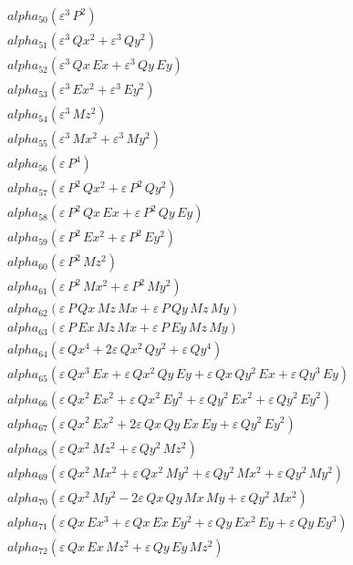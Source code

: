 \documentclass{article}
\begin{document}
\begin{align*}
  &\quad alpha_{50} \left(ε^{3}\,P^{2}\right) \\
  &\quad alpha_{51} \left(ε^{3}\,Qx^{2} + ε^{3}\,Qy^{2}\right) \\
  &\quad alpha_{52} \left(ε^{3}\,Qx\,Ex + ε^{3}\,Qy\,Ey\right) \\
  &\quad alpha_{53} \left(ε^{3}\,Ex^{2} + ε^{3}\,Ey^{2}\right) \\
  &\quad alpha_{54} \left(ε^{3}\,Mz^{2}\right) \\
  &\quad alpha_{55} \left(ε^{3}\,Mx^{2} + ε^{3}\,My^{2}\right) \\
  &\quad alpha_{56} \left(ε\,P^{4}\right) \\
  &\quad alpha_{57} \left(ε\,P^{2}\,Qx^{2} + ε\,P^{2}\,Qy^{2}\right) \\
  &\quad alpha_{58} \left(ε\,P^{2}\,Qx\,Ex + ε\,P^{2}\,Qy\,Ey\right) \\
  &\quad alpha_{59} \left(ε\,P^{2}\,Ex^{2} + ε\,P^{2}\,Ey^{2}\right) \\
  &\quad alpha_{60} \left(ε\,P^{2}\,Mz^{2}\right) \\
  &\quad alpha_{61} \left(ε\,P^{2}\,Mx^{2} + ε\,P^{2}\,My^{2}\right) \\
  &\quad alpha_{62} \left(ε\,P\,Qx\,Mz\,Mx + ε\,P\,Qy\,Mz\,My\right) \\
  &\quad alpha_{63} \left(ε\,P\,Ex\,Mz\,Mx + ε\,P\,Ey\,Mz\,My\right) \\
  &\quad alpha_{64} \left(ε\,Qx^{4} + 2ε\,Qx^{2}\,Qy^{2} + ε\,Qy^{4}\right) \\
  &\quad alpha_{65} \left(ε\,Qx^{3}\,Ex + ε\,Qx^{2}\,Qy\,Ey + ε\,Qx\,Qy^{2}\,Ex + ε\,Qy^{3}\,Ey\right) \\
  &\quad alpha_{66} \left(ε\,Qx^{2}\,Ex^{2} + ε\,Qx^{2}\,Ey^{2} + ε\,Qy^{2}\,Ex^{2} + ε\,Qy^{2}\,Ey^{2}\right) \\
  &\quad alpha_{67} \left(ε\,Qx^{2}\,Ex^{2} + 2ε\,Qx\,Qy\,Ex\,Ey + ε\,Qy^{2}\,Ey^{2}\right) \\
  &\quad alpha_{68} \left(ε\,Qx^{2}\,Mz^{2} + ε\,Qy^{2}\,Mz^{2}\right) \\
  &\quad alpha_{69} \left(ε\,Qx^{2}\,Mx^{2} + ε\,Qx^{2}\,My^{2} + ε\,Qy^{2}\,Mx^{2} + ε\,Qy^{2}\,My^{2}\right) \\
  &\quad alpha_{70} \left(ε\,Qx^{2}\,My^{2} - 2ε\,Qx\,Qy\,Mx\,My + ε\,Qy^{2}\,Mx^{2}\right) \\
  &\quad alpha_{71} \left(ε\,Qx\,Ex^{3} + ε\,Qx\,Ex\,Ey^{2} + ε\,Qy\,Ex^{2}\,Ey + ε\,Qy\,Ey^{3}\right) \\
  &\quad alpha_{72} \left(ε\,Qx\,Ex\,Mz^{2} + ε\,Qy\,Ey\,Mz^{2}\right) \\

\end{align*}
\end{document}
